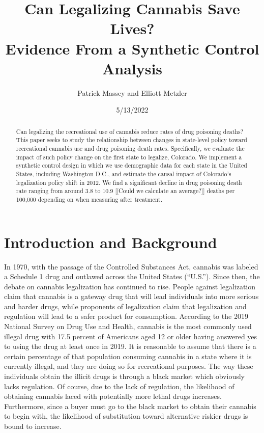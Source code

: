 \documentclass{article}
\author{Patrick Massey and Elliott Metzler}
\title{Can Legalizing Cannabis Save Lives? \\
Evidence From a Synthetic Control Analysis}
\date{5/13/2022}
\begin{document}
\maketitle

\begin{abstract}

Can legalizing the recreational use of cannabis reduce rates of drug poisoning deaths? This paper seeks to study the relationship between changes in state-level policy toward recreational cannabis use and drug poisoning death rates. Specifically, we evaluate the impact of such policy change on the first state to legalize, Colorado. We implement a synthetic control design in which we use demographic data for each state in the United States, including Washington D.C., and estimate the causal impact of Colorado's legalization policy shift in 2012. We find a significant decline in drug poisoning death rate ranging from around 3.8 to 10.9 [[Could we calculate an average?]] deaths per 100,000 depending on when measuring after treatment.

\end{abstract}

\newpage

\section{Introduction and Background}

In 1970, with the passage of the Controlled Substances Act, cannabis was labeled a Schedule 1 drug and outlawed across the United States (``U.S.''). Since then, the debate on cannabis legalization has continued to rise. People against legalization claim that cannabis is a gateway drug that will lead individuals into more serious and harder drugs, while proponents of legalization claim that legalization and regulation will lead to a safer product for consumption. According to the 2019 National Survey on Drug Use and Health, cannabis is the most commonly used illegal drug with 17.5 percent of Americans aged 12 or older having answered yes to using the drug at least once in 2019.  It is reasonable to assume that there is a certain percentage of that population consuming cannabis in a state where it is currently illegal, and they are doing so for recreational purposes. The way these individuals obtain the illicit drugs is through a black market which obviously lacks regulation. Of course, due to the lack of regulation, the likelihood of obtaining cannabis laced with potentially more lethal drugs increases. Furthermore, since a buyer must go to the black market to obtain their cannabis to begin with, the likelihood of substitution toward alternative riskier drugs is bound to increase.
\end{document}
